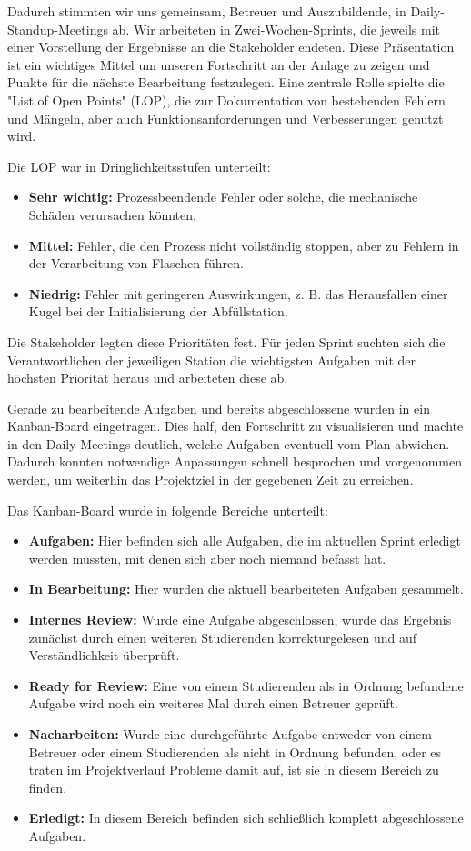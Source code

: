 Dadurch stimmten wir uns gemeinsam, Betreuer und Auszubildende, in Daily-Standup-Meetings ab. Wir arbeiteten in Zwei-Wochen-Sprints, die jeweils mit einer Vorstellung der 
Ergebnisse an die Stakeholder endeten. Diese Präsentation ist ein wichtiges Mittel um unseren Fortschritt an der Anlage zu zeigen und Punkte für die nächste 
Bearbeitung festzulegen. Eine zentrale Rolle spielte die "List of Open Points" (LOP), die zur Dokumentation 
von bestehenden Fehlern und Mängeln, aber auch Funktionsanforderungen und Verbesserungen genutzt wird.

Die LOP war in Dringlichkeitsstufen unterteilt:
\begin{itemize}
    \item \textbf{Sehr wichtig:} Prozessbeendende Fehler oder solche, die mechanische Schäden verursachen könnten.
    \item \textbf{Mittel:} Fehler, die den Prozess nicht vollständig stoppen, aber zu Fehlern in der Verarbeitung von Flaschen führen.
    \item \textbf{Niedrig:} Fehler mit geringeren Auswirkungen, z. B. das Herausfallen einer Kugel bei der Initialisierung der Abfüllstation.
\end{itemize}

Die Stakeholder legten diese Prioritäten fest. Für jeden Sprint suchten sich die Verantwortlichen der jeweiligen Station 
die wichtigsten Aufgaben mit der höchsten Priorität heraus und arbeiteten diese ab.  

Gerade zu bearbeitende Aufgaben und bereits abgeschlossene wurden in ein Kanban-Board eingetragen. Dies half, den Fortschritt 
zu visualisieren und machte in den Daily-Meetings deutlich, welche Aufgaben eventuell vom Plan abwichen. Dadurch konnten 
notwendige Anpassungen schnell besprochen und vorgenommen werden, um weiterhin das Projektziel in der gegebenen Zeit zu 
erreichen.  

Das Kanban-Board wurde in folgende Bereiche unterteilt:
\begin{itemize}
    \item \textbf{Aufgaben:} Hier befinden sich alle Aufgaben, die im aktuellen Sprint erledigt werden müssten, mit denen 
    sich aber noch niemand befasst hat.
    \item \textbf{In Bearbeitung:} Hier wurden die aktuell bearbeiteten Aufgaben gesammelt.
    \item \textbf{Internes Review:} Wurde eine Aufgabe abgeschlossen, wurde das Ergebnis zunächst durch einen weiteren 
    Studierenden korrekturgelesen und auf Verständlichkeit überprüft.
    \item \textbf{Ready for Review:} Eine von einem Studierenden als in Ordnung befundene Aufgabe wird noch ein weiteres 
    Mal durch einen Betreuer geprüft.
    \item \textbf{Nacharbeiten:} Wurde eine durchgeführte Aufgabe entweder von einem Betreuer oder einem Studierenden als 
    nicht in Ordnung befunden, oder es traten im Projektverlauf Probleme damit auf, ist sie in diesem Bereich zu finden.
    \item \textbf{Erledigt:} In diesem Bereich befinden sich schließlich komplett abgeschlossene Aufgaben.
\end{itemize}


